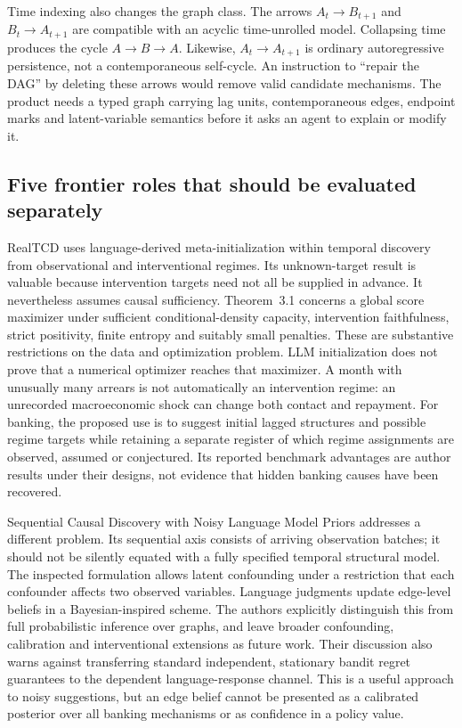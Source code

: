 Time indexing also changes the graph class. The arrows
$A_t\to B_{t+1}$ and $B_t\to A_{t+1}$ are compatible with an acyclic
time-unrolled model. Collapsing time produces the cycle $A\to B\to A$.
Likewise, $A_t\to A_{t+1}$ is ordinary autoregressive persistence, not a
contemporaneous self-cycle. An instruction to ``repair the DAG'' by deleting
these arrows would remove valid candidate mechanisms. The product needs a
typed graph carrying lag units, contemporaneous edges, endpoint marks and
latent-variable semantics before it asks an agent to explain or modify it.
\citep{exec15_latent_exact,exec15_latent_design}

\subsection{Five frontier roles that should be evaluated separately}

RealTCD uses language-derived meta-initialization within temporal discovery
from observational and interventional regimes. Its unknown-target result is
valuable because intervention targets need not all be supplied in advance.
It nevertheless assumes causal sufficiency. Theorem~3.1 concerns a global
score maximizer under sufficient conditional-density capacity, intervention
faithfulness, strict positivity, finite entropy and suitably small penalties.
These are substantive restrictions on the data and optimization problem.
LLM initialization does not prove that a numerical optimizer reaches that
maximizer. A month with unusually many arrears is not automatically an
intervention regime: an unrecorded macroeconomic shock can change both
contact and repayment. For banking, the proposed use is to suggest initial
lagged structures and possible regime targets while retaining a separate
register of which regime assignments are observed, assumed or conjectured.
Its reported benchmark advantages are author results under their designs,
not evidence that hidden banking causes have been recovered.
\citep{v12_la_2404_14786}

Sequential Causal Discovery with Noisy Language Model Priors addresses a
different problem. Its sequential axis consists of arriving observation
batches; it should not be silently equated with a fully specified temporal
structural model. The inspected formulation allows latent confounding under
a restriction that each confounder affects two observed variables. Language
judgments update edge-level beliefs in a Bayesian-inspired scheme. The
authors explicitly distinguish this from full probabilistic inference over
graphs, and leave broader confounding, calibration and interventional
extensions as future work. Their discussion also warns against transferring
standard independent, stationary bandit regret guarantees to the dependent
language-response channel. This is a useful approach to noisy suggestions,
but an edge belief cannot be presented as a calibrated posterior over all
banking mechanisms or as confidence in a policy value.
\citep{v12_la_2506_16234}

